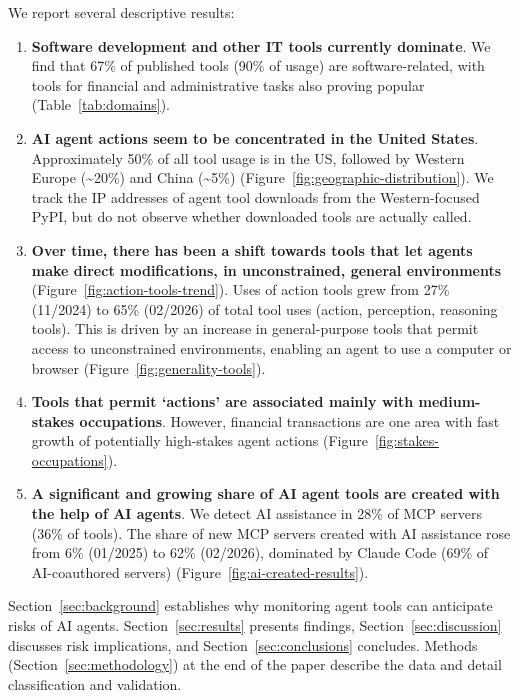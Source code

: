 \documentclass[manuscript,screen,nonacm,oneside]{acmart}
\begin{document}
We report several descriptive results:

\begin{enumerate}
\def\labelenumi{\arabic{enumi}.}
\item
 \textbf{Software development and other IT tools currently dominate}. We find that 67\% of published tools (90\% of usage) are software-related, with tools for financial and administrative tasks also proving popular (Table~\ref{tab:domains}).
\item
 \textbf{AI agent actions seem to be concentrated in the United States}. Approximately 50\% of all tool usage is in the US, followed by Western Europe (\textasciitilde20\%) and China (\textasciitilde5\%) (Figure~\ref{fig:geographic-distribution}). We track the IP addresses of agent tool downloads from the Western-focused PyPI, but do not observe whether downloaded tools are actually called.
\item
 \textbf{Over time, there has been a shift towards tools that let agents make direct modifications, in unconstrained, general environments} (Figure~\ref{fig:action-tools-trend}). Uses of action tools grew from 27\% (11/2024) to 65\% (02/2026) of total tool uses (action, perception, reasoning tools). This is driven by an increase in general-purpose tools that permit access to unconstrained environments, enabling an agent to use a computer or browser (Figure~\ref{fig:generality-tools}).
\item
 \textbf{Tools that permit `actions' are associated mainly with medium-stakes occupations}. However, financial transactions are one area with fast growth of potentially high-stakes agent actions (Figure~\ref{fig:stakes-occupations}).
\item
 \textbf{A significant and growing share of AI agent tools are created with the help of AI agents}. We detect AI assistance in 28\% of MCP servers (36\% of tools). The share of new MCP servers created with AI assistance rose from 6\% (01/2025) to 62\% (02/2026), dominated by Claude Code (69\% of AI-coauthored servers) (Figure~\ref{fig:ai-created-results}).
\end{enumerate}

Section~\ref{sec:background} establishes why monitoring agent tools can anticipate risks of AI agents. Section~\ref{sec:results} presents findings, Section~\ref{sec:discussion} discusses risk implications, and Section~\ref{sec:conclusions} concludes. Methods (Section~\ref{sec:methodology}) at the end of the paper describe the data and detail classification and validation.
\end{document}
